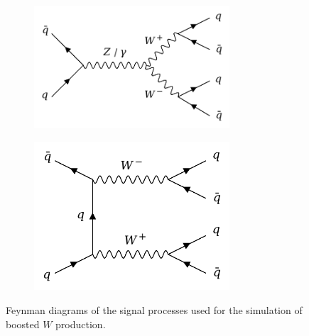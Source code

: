 \documentclass[main]{subfiles} %
\begin{document}
\begin{figure}[H]
     \centering
     \begin{subfigure}[h]{0.49\textwidth}
         \centering
         \includegraphics[width=0.8\textwidth]{../Figures/Datasets/pp_WW/qq_aZ_WW_qq.png}
          \caption{}
         \label{fig:feynman_WW_qqanihilation1}
     \end{subfigure}
     \begin{subfigure}[h]{0.49\textwidth}
         \centering
         \includegraphics[width=0.8\textwidth]{../Figures/Datasets/pp_WW/qq_WW_qq.png}
          \caption{}
         \label{fig:feynman_WW_qqanihilation2}
     \end{subfigure}
     \caption{Feynman diagrams of the signal processes used for the simulation of boosted $W$ production.}
        \label{fig:feynman_WW}
\end{figure} 

\vspace{11pt}

\label{sect:event-generation-chain}
\vspace{20pt}
\end{document}
